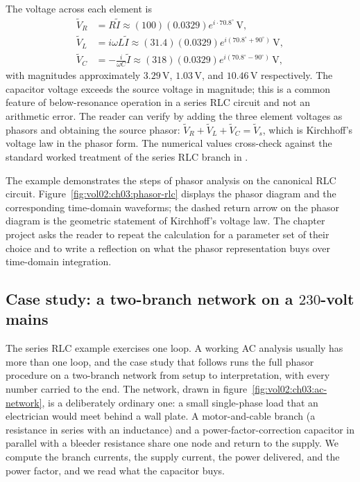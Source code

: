The voltage across each element is
\begin{align*}
\tilde{V}_{R} &= R \tilde{I} \approx (100)(0.0329) e^{i \cdot 70.8^{\circ}} \,\si{\volt}, \\
\tilde{V}_{L} &= i\omega L \tilde{I} \approx (31.4)(0.0329) e^{i(70.8^{\circ} + 90^{\circ})} \,\si{\volt}, \\
\tilde{V}_{C} &= -\frac{i}{\omega C} \tilde{I} \approx (318)(0.0329) e^{i(70.8^{\circ} - 90^{\circ})} \,\si{\volt},
\end{align*}
with magnitudes approximately $3.29 \,\si{\volt}$, $1.03 \,\si
{\volt}$, and $10.46 \,\si{\volt}$ respectively. The capacitor
voltage exceeds the source voltage in magnitude; this is a
common feature of below-resonance operation in a series RLC
circuit and not an arithmetic error. The reader can verify by
adding the three element voltages as phasors and obtaining the
source phasor: $\tilde{V}_{R} + \tilde{V}_{L} + \tilde{V}_{C} =
\tilde{V}_{s}$, which is Kirchhoff's voltage law in the phasor
form. The numerical values cross-check against the standard
worked treatment of the series RLC branch in
\cite[chapter 8]{text:v2ch03-irwin-nelms}.

The example demonstrates the steps of phasor analysis on the
canonical RLC circuit. Figure~\ref{fig:vol02:ch03:phasor-rlc}
displays the phasor diagram and the corresponding time-domain
waveforms; the dashed return arrow on the phasor diagram is the
geometric statement of Kirchhoff's voltage law. The chapter
project asks the reader to repeat the calculation for a
parameter set of their choice and to write a reflection on what
the phasor representation buys over time-domain integration.



\subsection{Case study: a two-branch network on a $230$-volt mains}

The series RLC example exercises one loop. A working AC analysis
usually has more than one loop, and the case study that follows runs
the full phasor procedure on a two-branch network from setup to
interpretation, with every number carried to the end. The network,
drawn in figure~\ref{fig:vol02:ch03:ac-network}, is a deliberately
ordinary one: a small single-phase load that an electrician would meet
behind a wall plate. A motor-and-cable branch (a resistance in series
with an inductance) and a power-factor-correction capacitor in
parallel with a bleeder resistance share one node and return to the
supply. We compute the branch currents, the supply current, the power
delivered, and the power factor, and we read what the capacitor buys.

